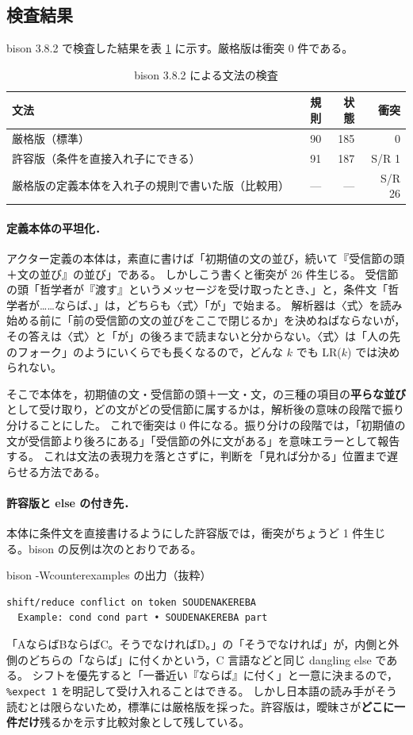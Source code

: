 \documentclass[a4paper,10pt]{ltjsarticle}
\begin{document}
\subsection{検査結果}

bison 3.8.2 で検査した結果を表 \ref{tab:bison} に示す。厳格版は衝突 0 件である。

\begin{table}[t]
\centering\small
\caption{bison 3.8.2 による文法の検査}\label{tab:bison}
\begin{tabular}{@{}lrrr@{}}
\toprule
文法 & 規則 & 状態 & 衝突 \\
\midrule
厳格版（標準） & 90 & 185 & 0 \\
許容版（条件を直接入れ子にできる） & 91 & 187 & S/R 1 \\
厳格版の定義本体を入れ子の規則で書いた版（比較用） & --- & --- & S/R 26 \\
\bottomrule
\end{tabular}
\end{table}

\paragraph{定義本体の平坦化．}
アクター定義の本体は，素直に書けば「初期値の文の並び，続いて『受信節の頭＋文の並び』の並び」である。
しかしこう書くと衝突が 26 件生じる。
受信節の頭「哲学者が『渡す』というメッセージを受け取ったとき、」と，条件文「哲学者が……ならば、」は，どちらも〈式〉「が」で始まる。
解析器は〈式〉を読み始める前に「前の受信節の文の並びをここで閉じるか」を決めねばならないが，その答えは〈式〉と「が」の後ろまで読まないと分からない。〈式〉は「人の先のフォーク」のようにいくらでも長くなるので，どんな $k$ でも LR($k$) では決められない。

そこで本体を，初期値の文・受信節の頭＋一文・文，の三種の項目の\textbf{平らな並び}として受け取り，どの文がどの受信節に属するかは，解析後の意味の段階で振り分けることにした。
これで衝突は 0 件になる。振り分けの段階では，「初期値の文が受信節より後ろにある」「受信節の外に文がある」を意味エラーとして報告する。
これは文法の表現力を落とさずに，判断を「見れば分かる」位置まで遅らせる方法である。

\paragraph{許容版と else の付き先．}
本体に条件文を直接書けるようにした許容版では，衝突がちょうど 1 件生じる。bison の反例は次のとおりである。
\begin{prog}{bison -Wcounterexamples の出力（抜粋）}
\begin{Verbatim}[fontsize=\footnotesize]
shift/reduce conflict on token SOUDENAKEREBA
  Example: cond cond part • SOUDENAKEREBA part
\end{Verbatim}
\end{prog}
「AならばBならばC。そうでなければD。」の「そうでなければ」が，内側と外側のどちらの「ならば」に付くかという，C 言語などと同じ dangling else である。
シフトを優先すると「一番近い『ならば』に付く」と一意に決まるので，\verb|%expect 1| を明記して受け入れることはできる。
しかし日本語の読み手がそう読むとは限らないため，標準には厳格版を採った。許容版は，曖昧さが\textbf{どこに一件だけ}残るかを示す比較対象として残している。
\end{document}
